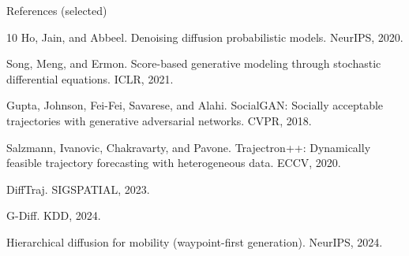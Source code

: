 \documentclass[aspectratio=169]{beamer}
\begin{document}
\begin{frame}{References (selected)}
\scriptsize
\begin{thebibliography}{10}
Ho, Jain, and Abbeel.
\newblock Denoising diffusion probabilistic models.
\newblock NeurIPS, 2020.

Song, Meng, and Ermon.
\newblock Score-based generative modeling through stochastic differential equations.
\newblock ICLR, 2021.

Gupta, Johnson, Fei-Fei, Savarese, and Alahi.
\newblock Social{GAN}: Socially acceptable trajectories with generative adversarial networks.
\newblock CVPR, 2018.

Salzmann, Ivanovic, Chakravarty, and Pavone.
\newblock Trajectron++: Dynamically feasible trajectory forecasting with heterogeneous data.
\newblock ECCV, 2020.

DiffTraj.
\newblock SIGSPATIAL, 2023.

G-Diff.
\newblock KDD, 2024.

Hierarchical diffusion for mobility (waypoint-first generation).
\newblock NeurIPS, 2024.
\end{thebibliography}
\end{frame}
\end{document}

